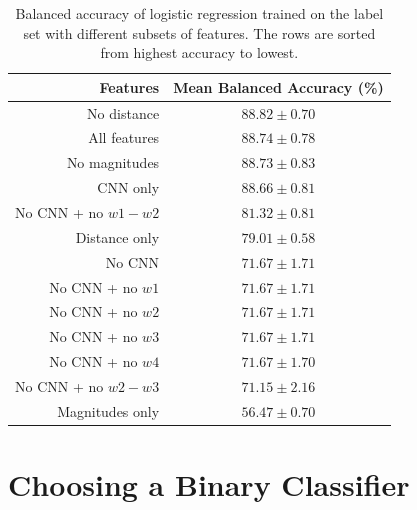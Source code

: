     \begin{table}
      \centering
      \begin{tabular}{r|c}
        \textbf{Features} & \textbf{Mean Balanced Accuracy (\%)}\\\hline
        No distance & $88.82 \pm 0.70$\\
        All features & $88.74 \pm 0.78$\\
        No magnitudes & $88.73 \pm 0.83$\\
        CNN only & $88.66 \pm 0.81$\\
        No CNN + no $w1 - w2$ & $81.32 \pm 0.81$\\
        Distance only & $79.01 \pm 0.58$\\
        No CNN & $71.67 \pm 1.71$\\
        No CNN + no $w1$ & $71.67 \pm 1.71$\\
        No CNN + no $w2$ & $71.67 \pm 1.71$\\
        No CNN + no $w3$ & $71.67 \pm 1.71$\\
        No CNN + no $w4$ & $71.67 \pm 1.70$\\
        No CNN + no $w2 - w3$ & $71.15 \pm 2.16$\\
        Magnitudes only & $56.47 \pm 0.70$\\
      \end{tabular}
      \caption{Balanced accuracy of logistic regression trained on the
        \citeauthor{norris06} label set with different subsets of features. The
        rows are sorted from highest accuracy to lowest.}
      \label{tab:feature-ablation}
    \end{table}

\section{Choosing a Binary Classifier}
\label{sec:binary-classifiers}
  
